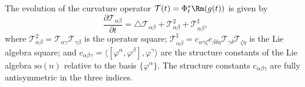 \begin{proposition}\label{prop:curvature-operator-evolution}
\label{Mevol}

The evolution of the curvature operator ${\mathcal
T}(t)=\Phi_t^*\Rm(g(t))$ is given by
\[ \frac{\partial {\mathcal T}_{\alpha\beta}}{\partial t} = \triangle
{\mathcal T}_{\alpha\beta} + {\mathcal T}^{2}_{\alpha\beta} +
{\mathcal T}^{\sharp}_{\alpha\beta},
\] where ${\mathcal T}^{2}_{\alpha\beta}={\mathcal T}_{\alpha\gamma}{\mathcal
T}_{\gamma\beta}$ is the operator square; ${\mathcal T}^{\sharp}_{\alpha\beta}
 =
c_{\alpha\gamma\zeta}c_{\beta\delta\eta}{\mathcal T}_{\gamma\delta}{\mathcal
T}_{\zeta\eta}$ is the Lie algebra square; and $c_{\alpha\beta\gamma} =
\langle[\varphi^{\alpha},\varphi^{\beta}],\varphi^{\gamma}\rangle $ are the
structure constants of the Lie algebra $\mathrm{so}(n)$ relative to the basis
$\{\varphi^{\alpha}\}$. The structure constants $c_{\alpha\beta\gamma}$  are
fully antisymmetric in the three indices.
\end{proposition}

